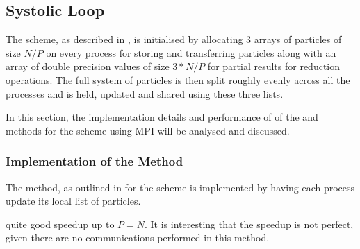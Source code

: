 \subsection{Systolic Loop}

%
The \systolicloop{} scheme, as described in
,
is initialised by allocating 3 arrays of particles of
size $N/P$ on every process for storing and transferring particles
along with an array of double precision values of size $3*N/P$ for
partial results for reduction operations.
%
The full system of particles is then
split roughly evenly across all the processes
and is held, updated and shared using these three lists.

In this section, the implementation details and performance of
of the \individualoperation{} and \pairoperation{} methods
for the \systolicloop{} scheme using MPI will be analysed and discussed.


%
%

\subsubsection{Implementation of the \individualoperation{} Method}

The \individualoperation{} method, as outlined in
for the \systolicloop{} scheme
is implemented by having each process update its local list of particles.


%
%
\begin{figure}[!h]
    
    \caption{
        \vZeroSpeedupCaption
            {\systolicloop{}}
            {\individualoperation{}}
    }
    \label{fig:v0_systolic_individual_operation_speedups}
\end{figure}


\vZeroSpeedupExplanation
    {}
    {\systolicloop{}}
    {\individualoperation{}}


%

 quite good speedup
up to $P = N$.
%
It is interesting that the speedup is not perfect, given there are
no communications performed in this method.

